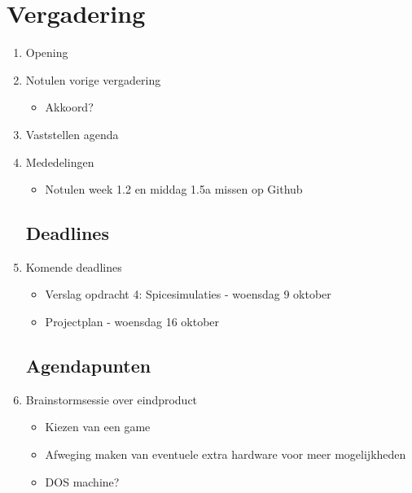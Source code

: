 \documentclass{article}
\begin{document}
\section*{Vergadering}
\begin{enumerate}
	
	\subsection*{Vooraf}
	\item Opening
	\item Notulen vorige vergadering
	\begin{itemize}
		\item Akkoord?
	\end{itemize}
	\item Vaststellen agenda
	\item Mededelingen
	\begin{itemize}
		\item Notulen week 1.2 en middag 1.5a missen op Github
	\end{itemize}

	\subsection*{Deadlines}
	\item Komende deadlines
	\begin{itemize}
		\item Verslag opdracht 4: Spicesimulaties - woensdag 9 oktober
		\item Projectplan - woensdag 16 oktober
	\end{itemize}

	\subsection*{Agendapunten}
	
	\item Brainstormsessie over eindproduct
	\begin{itemize}
		\item Kiezen van een game
		\item Afweging maken van eventuele extra hardware voor meer mogelijkheden
		\item DOS machine?
	\end{itemize}


\end{enumerate}
\end{document}
